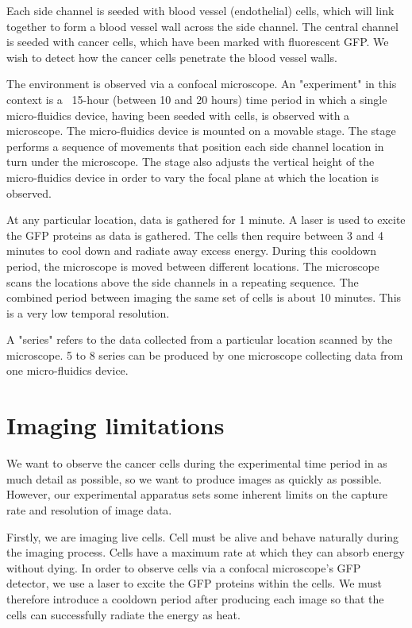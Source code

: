 Each side channel is seeded with blood vessel (endothelial) cells, which will link together to form a blood vessel wall across the side channel. The central channel is seeded with cancer cells, which have been marked with fluorescent GFP. We wish to detect how the cancer cells penetrate the blood vessel walls.

The environment is observed via a confocal microscope. An "experiment" in this context is a ~15-hour (between 10 and 20 hours) time period in which a single micro-fluidics device, having been seeded with cells, is observed with a microscope. The micro-fluidics device is mounted on a movable stage. The stage performs a sequence of movements that position each side channel location in turn under the microscope. The stage also adjusts the vertical height of the micro-fluidics device in order to vary the focal plane at which the location is observed.

At any particular location, data is gathered for 1 minute. A laser is used to excite the GFP proteins as data is gathered. The cells then require between 3 and 4 minutes to cool down and radiate away excess energy. During this cooldown period, the microscope is moved between different locations. The microscope scans the locations above the side channels in a repeating sequence. The combined period between imaging the same set of cells is about 10 minutes. This is a very low temporal resolution.

A "series" refers to the data collected from a particular location scanned by the microscope. 5 to 8 series can be produced by one microscope collecting data from one micro-fluidics device.

\section{Imaging limitations}

We want to observe the cancer cells during the experimental time period in as much detail as possible, so we want to produce images as quickly as possible. However, our experimental apparatus sets some inherent limits on the capture rate and resolution of image data.

Firstly, we are imaging live cells. Cell must be alive and behave naturally during the imaging process. Cells have a maximum rate at which they can absorb energy without dying.  In order to observe cells via a confocal microscope's GFP detector, we use a laser to excite the GFP proteins within the cells. We must therefore introduce a cooldown period after producing each image so that the cells can successfully radiate the energy as heat.

